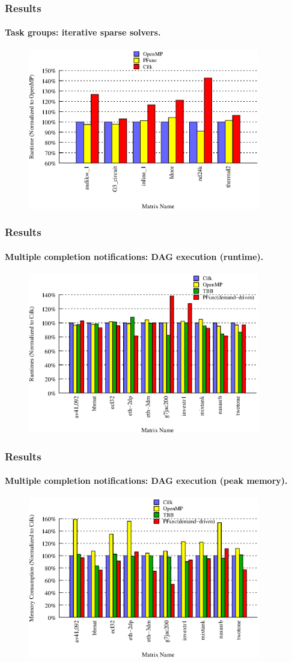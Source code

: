 \documentclass{beamer}
\begin{document}
\begin{frame}[fragile]
\frametitle{Results}
\framesubtitle{Task groups: iterative sparse solvers.}
\begin{figure}
\includegraphics[width=0.9\textwidth]{figs/cg_8}
\label{fig:cg}
\end{figure}
\end{frame}

\begin{frame}[fragile]
\frametitle{Results}
\framesubtitle{Multiple completion notifications: DAG execution (runtime).}
\begin{figure}
\includegraphics[width=0.9\textwidth]{figs/dag_speedup}
\label{fig:dag_speedup}
\end{figure}
\end{frame}

\begin{frame}[fragile]
\frametitle{Results}
\framesubtitle{Multiple completion notifications: DAG execution (peak memory).}
\begin{figure}
\includegraphics[width=0.9\textwidth]{figs/dag_memory}
\label{fig:dag_memory}
\end{figure}
\end{frame}
\end{document}
